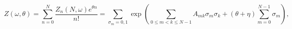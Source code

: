 \begin{equation}
Z(\omega,\theta)=\sum_{n=0}^N \frac{Z_n(N,\omega)e^{\theta n}}{n!} =
\sum_{\sigma_m=0,1} \exp \left( \sum_{0 \le m<k \le N-1}A_{mk}
\sigma_m\sigma_k+(\theta+\eta) \sum_{m=0}^{N-1} \sigma_m \right),
\label{grand}\end{equation}


